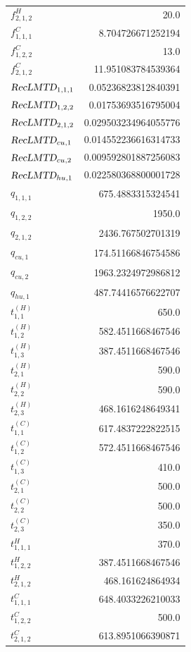 \documentclass{article}%
\begin{document}
\begin{multicols*}{3}
\begin{supertabular}{lr}
	$f_{2,1,2}^{H}$ & 20.0 \\%
	$f_{1,1,1}^{C}$ & 8.704726671252194 \\%
	$f_{1,2,2}^{C}$ & 13.0 \\%
	$f_{2,1,2}^{C}$ & 11.951083784539364 \\%
	$\textsl{RecLMTD}_{1,1,1}$ & 0.05236823812840391 \\%
	$\textsl{RecLMTD}_{1,2,2}$ & 0.01753693516795004 \\%
	$\textsl{RecLMTD}_{2,1,2}$ & 0.029503234964055776 \\%
	$\textsl{RecLMTD}_{cu,1}$ & 0.014552236616314733 \\%
	$\textsl{RecLMTD}_{cu,2}$ & 0.009592801887256083 \\%
	$\textsl{RecLMTD}_{hu,1}$ & 0.022580368800001728 \\%
	$q_{1,1,1}$ & 675.4883315324541 \\%
	$q_{1,2,2}$ & 1950.0 \\%
	$q_{2,1,2}$ & 2436.767502701319 \\%
	$q_{cu,1}$ & 174.51166846754586 \\%
	$q_{cu,2}$ & 1963.2324972986812 \\%
	$q_{hu,1}$ & 487.74416576622707 \\%
	$t_{1,1}^{(H)}$ & 650.0 \\%
	$t_{1,2}^{(H)}$ & 582.4511668467546 \\%
	$t_{1,3}^{(H)}$ & 387.4511668467546 \\%
	$t_{2,1}^{(H)}$ & 590.0 \\%
	$t_{2,2}^{(H)}$ & 590.0 \\%
	$t_{2,3}^{(H)}$ & 468.1616248649341 \\%
	$t_{1,1}^{(C)}$ & 617.4837222822515 \\%
	$t_{1,2}^{(C)}$ & 572.4511668467546 \\%
	$t_{1,3}^{(C)}$ & 410.0 \\%
	$t_{2,1}^{(C)}$ & 500.0 \\%
	$t_{2,2}^{(C)}$ & 500.0 \\%
	$t_{2,3}^{(C)}$ & 350.0 \\%
	$t_{1,1,1}^{H}$ & 370.0 \\%
	$t_{1,2,2}^{H}$ & 387.4511668467546 \\%
	$t_{2,1,2}^{H}$ & 468.161624864934 \\%
	$t_{1,1,1}^{C}$ & 648.4033226210033 \\%
	$t_{1,2,2}^{C}$ & 500.0 \\%
	$t_{2,1,2}^{C}$ & 613.8951066390871 \\%

\end{supertabular}
\end{multicols*}
\end{document}
